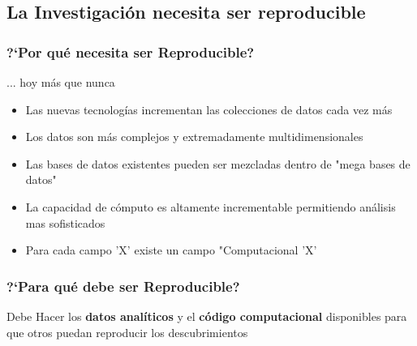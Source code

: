 \documentclass[sans serif,9pt,xcolor=dvipsnames]{beamer}%
\begin{document}
\subsection{La Investigación necesita ser reproducible}
\begin{frame}
\frametitle{?`Por qué necesita ser Reproducible?}
\begin{block}{... hoy más que nunca}
\begin{itemize}
\justifying
\item Las nuevas tecnologías incrementan las colecciones de datos cada vez más
\item Los datos son más complejos y extremadamente multidimensionales
\item Las bases de datos existentes pueden ser mezcladas dentro de "mega bases de datos"
\item La capacidad de cómputo es altamente incrementable permitiendo análisis mas sofisticados
\item Para cada campo 'X' existe un campo "Computacional 'X'
\end{itemize}
\end{block}
\end{frame}

\begin{frame}
\frametitle {?`Para qué debe ser Reproducible?}
\justifying
\begin{block}{Debe}
\LARGE Hacer los \textbf{datos analíticos} y el \textbf{código computacional} disponibles para que otros puedan reproducir los descubrimientos
\end{block}
\end{frame}
\end{document}
